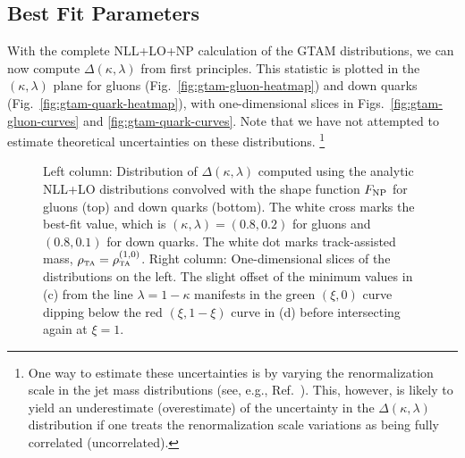 \documentclass[letterpaper,11pt]{article}
\newcommand{\Ref}[1]{Ref.~\cite{#1}}
\newcommand{\Fig}[1]{Fig.~\ref{#1}}
\newcommand{\Figs}[2]{Figs.~\ref{#1} and \ref{#2}}
\begin{document}

\subsection{Best Fit Parameters}
\label{sec:calculation-best-fit}


With the complete NLL+LO+NP calculation of the GTAM distributions, we can now compute $\Delta(\kappa,\lambda)$ from first principles. 
%
This statistic is plotted in the $(\kappa,\lambda)$ plane for gluons (\Fig{fig:gtam-gluon-heatmap}) and down quarks (\Fig{fig:gtam-quark-heatmap}), with one-dimensional slices in \Figs{fig:gtam-gluon-curves}{fig:gtam-quark-curves}. 
%
Note that we have not attempted to estimate theoretical uncertainties on these distributions.%
%
\footnote{One way to estimate these uncertainties is by varying the renormalization scale in the jet mass distributions (see, e.g., \Ref{Chang:2013iba}).  This, however, is likely to yield an underestimate (overestimate) of the uncertainty in the $\Delta(\kappa,\lambda)$ distribution if one treats the renormalization scale variations as being fully correlated (uncorrelated).}


\begin{figure}[t]
	\centering
	
	\caption{\label{fig:gtam-delta}Left column:  Distribution of $\Delta(\kappa,\lambda)$ computed using the analytic NLL+LO distributions convolved with the shape function $F_{\rm NP}$ for gluons (top) and down quarks (bottom). The white cross marks the best-fit value, which is $(\kappa,\lambda) = (0.8,0.2)$ for gluons and $(0.8,0.1)$ for down quarks. The white dot marks track-assisted mass, $\rho_{\mbox{\tiny TA}} = \rho_{\mbox{\tiny TA}}^{(1,0)}$. Right column:  One-dimensional slices of the distributions on the left. The slight offset of the minimum values in (c) from the line $\lambda = 1-\kappa$ manifests in the green $(\xi,0)$ curve dipping below the red $(\xi,1-\xi)$ curve in (d) before intersecting again at $\xi = 1$. }
\end{figure}
\end{document}
